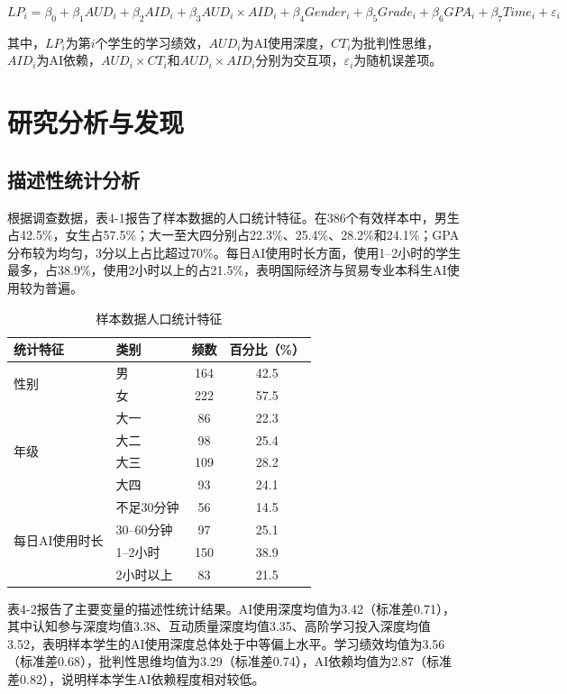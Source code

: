 \documentclass{njtech-thesis}
\begin{document}
$$LP_i = \beta_0 + \beta_1 AUD_i + \beta_2 AID_i + \beta_3 AUD_i \times AID_i + \beta_4 Gender_i + \beta_5 Grade_i + \beta_6 GPA_i + \beta_7 Time_i + \varepsilon_i$$

其中，$LP_i$为第$i$个学生的学习绩效，$AUD_i$为AI使用深度，$CT_i$为批判性思维，$AID_i$为AI依赖，$AUD_i \times CT_i$和$AUD_i \times AID_i$分别为交互项，$\varepsilon_i$为随机误差项。

\section{研究分析与发现}

\subsection{描述性统计分析}

根据调查数据，表4-1报告了样本数据的人口统计特征。在386个有效样本中，男生占42.5\%，女生占57.5\%；大一至大四分别占22.3\%、25.4\%、28.2\%和24.1\%；GPA分布较为均匀，3分以上占比超过70\%。每日AI使用时长方面，使用1--2小时的学生最多，占38.9\%，使用2小时以上的占21.5\%，表明国际经济与贸易专业本科生AI使用较为普遍。

\begin{table}[htbp]
  \centering
  \caption{样本数据人口统计特征}
  \begin{tabular}{llcc}
    \toprule
    统计特征 & 类别 & 频数 & 百分比（\%） \\
    \midrule
    \multirow{2}{*}{性别} & 男 & 164 & 42.5 \\
     & 女 & 222 & 57.5 \\
    \midrule
    \multirow{4}{*}{年级} & 大一 & 86 & 22.3 \\
     & 大二 & 98 & 25.4 \\
     & 大三 & 109 & 28.2 \\
     & 大四 & 93 & 24.1 \\
    \midrule
    \multirow{4}{*}{每日AI使用时长} & 不足30分钟 & 56 & 14.5 \\
     & 30--60分钟 & 97 & 25.1 \\
     & 1--2小时 & 150 & 38.9 \\
     & 2小时以上 & 83 & 21.5 \\
    \bottomrule
  \end{tabular}
\end{table}

表4-2报告了主要变量的描述性统计结果。AI使用深度均值为3.42（标准差0.71），其中认知参与深度均值3.38、互动质量深度均值3.35、高阶学习投入深度均值3.52，表明样本学生的AI使用深度总体处于中等偏上水平。学习绩效均值为3.56（标准差0.68），批判性思维均值为3.29（标准差0.74），AI依赖均值为2.87（标准差0.82），说明样本学生AI依赖程度相对较低。
\end{document}
